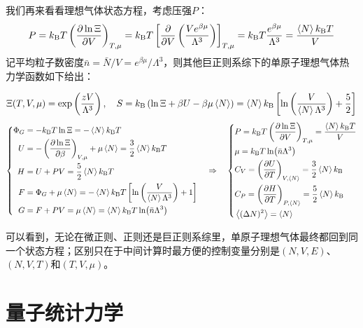 我们再来看看理想气体状态方程，考虑压强$P$：
\[P=k_{\rm B}T\left(\pdv{\ln\Xi}{V}\right)_{T,\mu}=k_{\rm B}T\left[\pdv{V}\left(\frac{Ve^{\beta\mu}}{\Lambda^3}\right)\right]_{T,\mu}=k_{\rm B}T\frac{e^{\beta\mu}}{\Lambda^3}=\frac{\expval{N}k_{\rm B}T}{V}\]
记平均粒子数密度$\bar n=\bar N/V=e^{\beta\mu}/\Lambda^3$，则其他巨正则系综下的单原子理想气体热力学函数如下给出：
\begin{theorem}[巨正则系综下单原子理想气体的热力学函数]
\[\Xi(T,V,\mu)=\exp\left(\frac{zV}{\Lambda^3}\right), \quad S=k_{\rm B}\left(\ln\Xi+\beta U-\beta\mu \expval{N}\right)=\expval{N} k_{\rm B}\left[\ln\left(\frac{V}{\expval{N}\Lambda^3}\right)+\frac{5}{2}\right]\]
\[\left\{\begin{aligned}
\Phi_G&=-k_{\rm B}T\ln\Xi=-\expval{N} k_{\rm B}T\\
U&=-\left(\pdv{\ln\Xi}{\beta}\right)_{V,\mu}+\mu \expval{N}=\frac{3}{2}\expval{N} k_{\rm B}T\\
H&=U+PV=\frac{5}{2}\expval{N} k_{\rm B}T\\
F&=\Phi_G+\mu \expval{N}=-\expval{N} k_{\rm B}T\left[\ln\left(\frac{V}{\expval{N}\Lambda^3}\right)+1\right]\\
G&=F+PV=\mu \expval{N}=\expval{N} k_{\rm B}T\ln(\bar n\Lambda^3)
\end{aligned}\right.
\quad \Rightarrow \quad
\left\{\begin{aligned}
&P=k_{\rm B}T\left(\pdv{\ln\Xi}{V}\right)_{T,\mu}=\frac{\expval{N} k_{\rm B}T}{V}\\
&\mu=k_{\rm B}T\ln(\bar n\Lambda^3)\\
&C_V=\left(\pdv{U}{T}\right)_{V,\expval{N}}=\frac{3}{2}\expval{N} k_{\rm B}\\
&C_P=\left(\pdv{H}{T}\right)_{P,\expval{N}}=\frac{5}{2}\expval{N} k_{\rm B}\\
&\expval{(\Delta N)^2}=\expval{N}
\end{aligned}\right.\]
\end{theorem}

可以看到，无论在微正则、正则还是巨正则系综里，单原子理想气体最终都回到同一个状态方程；区别只在于中间计算时最方便的控制变量分别是$(N,V,E)$、$(N,V,T)$和$(T,V,\mu)$。

\newpage
\section{量子统计力学}\label{sec:quantum_sm}
